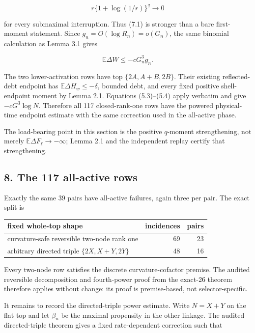 \[
 r\{1+\log(1/r)\}^q\longrightarrow0                 \tag{7.2}
\]

for every submaximal interruption. Thus (7.1) is stronger than a bare
first-moment statement. Since \(g_n=O(\log R_n)=o(G_n)\), the same
binomial calculation as Lemma 3.1 gives

\[
 \mathbb E\Delta W\le-cG_n^3g_n.                     \tag{7.3}
\]

The two lower-activation rows have top \(\{2A,A+B,2B\}\). Their existing
reflected-debt endpoint has \(\mathbb E\Delta H_w\le-\delta\), bounded
debt, and every fixed positive shell-endpoint moment by Lemma 2.1.
Equations (5.3)--(5.4) apply verbatim and give \(-cG^3\log N\).
Therefore all 117 closed-rank-one rows have the powered physical-time
endpoint estimate with the same correction used in the all-active phase.

The load-bearing point in this section is the positive \(q\)-moment
strengthening, not merely \(\mathbb E\Delta F_\ell\to-\infty\); Lemma
2.1 and the independent replay certify that strengthening.

\subsection{8. The 117 all-active rows}

Exactly the same 39 pairs have all-active failures, again three per
pair. The exact split is

{\small{} %
\begin{longtable}[]{@{}lrr@{}}
\toprule\noalign{}
fixed whole-top shape & incidences & pairs \\
\midrule\noalign{}
\endhead
\bottomrule\noalign{}
\endlastfoot
curvature-safe reversible two-node rank one & 69 & 23 \\
arbitrary directed triple \(\{2X,X+Y,2Y\}\) & 48 & 16 \\
\end{longtable}
}

Every two-node row satisfies the discrete curvature-cofactor premise.
The audited reversible decomposition and fourth-power proof from the
exact-26 theorem therefore applies without change: its proof is
premise-based, not selector-specific.

It remains to record the directed-triple power estimate. Write \(N=X+Y\)
on the flat top and let \(\beta_n\) be the maximal propensity in the
other linkage. The audited directed-triple theorem gives a fixed
rate-dependent correction such that

